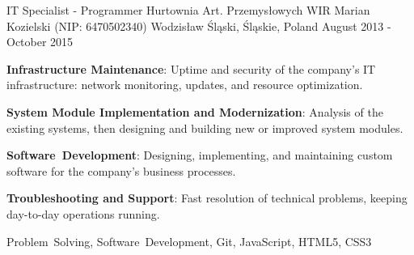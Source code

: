 \begin{cventries}
  \cventry
    {IT Specialist - Programmer} %
    {Hurtownia Art. Przemysłowych WIR Marian Kozielski (NIP: 6470502340)} %
    {Wodzisław Śląski, Śląskie, Poland} %
    {August 2013 - October 2015} %
    {
      \begin{cvitems} %
        \item {\textbf{Infrastructure Maintenance}: Uptime and security of the company's IT infrastructure: network monitoring, updates, and resource optimization.}
        \item {\textbf{System Module Implementation and Modernization}: Analysis of the existing systems, then designing and building new or improved system modules.}
        \item {\textbf{Software~Development}: Designing, implementing, and maintaining custom software for the company's business processes.}
        \item {\textbf{Troubleshooting and Support}: Fast resolution of technical problems, keeping day-to-day operations running.}
      \end{cvitems}
    }
    {Problem~Solving, Software~Development, Git, JavaScript, HTML5, CSS3}

\end{cventries}
